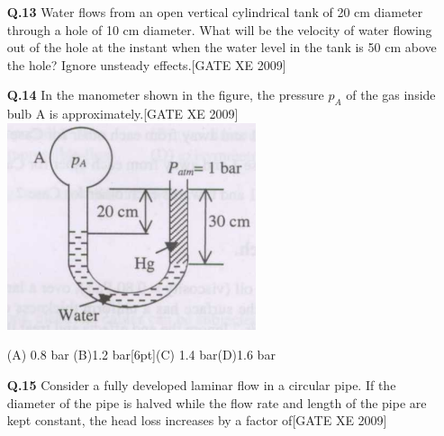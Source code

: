 \documentclass[journal,12pt,onecolumn]{IEEEtran}
\theoremstyle{remark}
\begin{document}
\begin{enumerate}
\item[\textbf{Q.13}] Water flows from an open vertical cylindrical tank of 20 cm diameter through a hole of 10 cm diameter. What will be the velocity of water flowing out of the hole at the instant when the water level in the tank is 50 cm above the hole? Ignore unsteady effects.\hfill[GATE XE 2009]\\
\begin{enumerate}
\end{enumerate}


\vspace{0.3cm}


\item[\textbf{Q.14}] In the manometer shown in the figure, the pressure $p_A$ of the gas inside bulb A is approximately.\hfill[GATE XE 2009]\\

\includegraphics[width=0.5\columnwidth]{figs/fig3.png}

(A) 0.8 bar \hfill (B)1.2 bar[6pt]\hfill(C) 1.4 bar\hfill(D)1.6 bar 


\vspace{0.3cm}

\item[\textbf{Q.15}] Consider a fully developed laminar flow in a circular pipe. If the diameter of the pipe is halved while the flow rate and length of the pipe are kept constant, the head loss increases by a factor of\hfill[GATE XE 2009]

\begin{enumerate}
\end{enumerate}


\end{enumerate}
\end{document}
